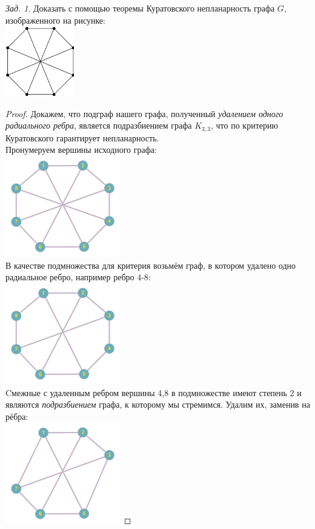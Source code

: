 \documentclass[a4paper,12pt]{article}
\theoremstyle{remark}
\newtheorem{problem}{Зад.}[section]
\begin{document}
\begin{problem}
	Доказать с помощью теоремы Куратовского непланарность графа $G$, изображенного на рисунке:
	\\ \includegraphics[width=3cm]{kuratovsky-task2-stage0-8angles.png}
\end{problem}
\begin{proof}
	Докажем, что подграф нашего графа, полученный \textit{удалением одного радиального ребра}, является подразбиением графа $K_{3,3}$, что по критерию Куратовского гарантирует непланарность.
	\\ Пронумеруем вершины исходного графа:
	\\ \includegraphics[width=5cm]{kuratovsky-task2-stage1.png}
	\\ В качестве подмножества для критерия возьмём граф, в котором удалено одно радиальное ребро, например ребро 4-8:
	\\ \includegraphics[width=5cm]{kuratovsky-task2-stage2.png}
	\\ Cмежные с удаленным ребром вершины 4,8 в подмножестве имеют степень 2 и являются \textit{подразбиением} графа, к которому мы стремимся. Удалим их, заменив на рёбра:
	\\ \includegraphics[width=5cm]{kuratovsky-task2-stage3.png}

\end{proof}
\end{document}
